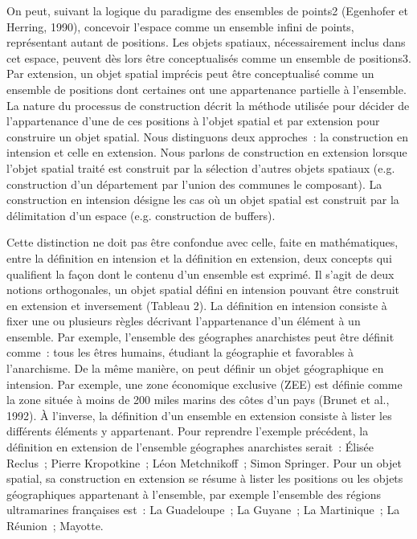 On peut, suivant la logique du paradigme des ensembles de points2
(Egenhofer et Herring, 1990), concevoir l’espace comme un ensemble
infini de points, représentant autant de positions. Les objets
spatiaux, nécessairement inclus dans cet espace, peuvent dès lors être
conceptualisés comme un ensemble de positions3. Par extension, un
objet spatial imprécis peut être conceptualisé comme un ensemble de
positions dont certaines ont une appartenance partielle à
l’ensemble. La nature du processus de construction décrit la méthode
utilisée pour décider de l’appartenance d’une de ces positions à
l’objet spatial et par extension pour construire un objet
spatial. Nous distinguons deux approches : la construction en
intension et celle en extension. Nous parlons de construction en
extension lorsque l’objet spatial traité est construit par la
sélection d’autres objets spatiaux (e.g. construction d’un département
par l’union des communes le composant). La construction en intension
désigne les cas où un objet spatial est construit par la délimitation
d’un espace (e.g. construction de buffers).

Cette distinction ne doit pas être confondue avec celle, faite en
mathématiques, entre la définition en intension et la définition en
extension, deux concepts qui qualifient la façon dont le contenu d’un
ensemble est exprimé. Il s’agit de deux notions orthogonales, un objet
spatial défini en intension pouvant être construit en extension et
inversement (Tableau 2). La définition en intension consiste à fixer
une ou plusieurs règles décrivant l’appartenance d’un élément à un
ensemble. Par exemple, l’ensemble des géographes anarchistes peut être
définit comme : tous les êtres humains, étudiant la géographie et
favorables à l’anarchisme. De la même manière, on peut définir un
objet géographique en intension. Par exemple, une zone économique
exclusive (ZEE) est définie comme la zone située à moins de 200 miles
marins des côtes d’un pays (Brunet et al., 1992). À l’inverse, la
définition d’un ensemble en extension consiste à lister les différents
éléments y appartenant. Pour reprendre l’exemple précédent, la
définition en extension de l’ensemble géographes anarchistes serait :
Élisée Reclus ; Pierre Kropotkine ; Léon Metchnikoff ; Simon
Springer. Pour un objet spatial, sa construction en extension se
résume à lister les positions ou les objets géographiques appartenant
à l’ensemble, par exemple l’ensemble des régions ultramarines
françaises est : La Guadeloupe ; La Guyane ; La Martinique ; La
Réunion ; Mayotte.

